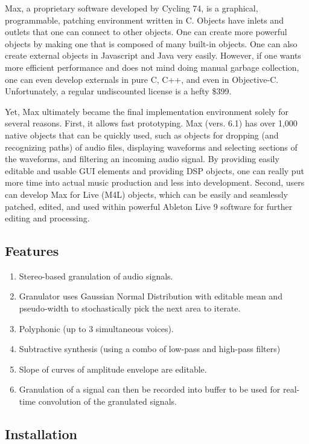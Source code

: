 \documentclass{article}
\begin{document}
		Max, a proprietary software developed by Cycling 74, is a graphical, programmable, patching environment written in C.  Objects have inlets and outlets that one can connect to other objects. One can create more powerful objects by making one that is composed of many built-in objects. One can also create external objects in Javascript and Java very easily. However, if one wants more efficient performance and does not mind doing manual garbage collection, one can even develop externals in pure C, C++, and even in Objective-C. Unfortunately, a regular undiscounted license is a hefty \$399.

		Yet, Max ultimately became the final implementation environment solely for several reasons. First, it allows fast prototyping. Max (vers. 6.1) has over 1,000 native objects that can be quickly used, such as objects for dropping (and recognizing paths) of audio files, displaying waveforms and selecting sections of the waveforms, and filtering an incoming audio signal. By providing easily editable and usable GUI elements and providing DSP objects, one can really put more time into actual music production and less into development. Second, users can develop Max for Live (M4L) objects, which can be easily and seamlessly patched, edited, and used within powerful Ableton Live 9 software for further editing and processing.
		\subsection{Features}

			\begin{enumerate}
				\item Stereo-based granulation of audio signals.
				\item Granulator uses Gaussian Normal Distribution with editable mean and pseudo-width to stochastically pick the next area to iterate.
				\item Polyphonic (up to 3 simultaneous voices).
				\item Subtractive synthesis (using a combo of low-pass and high-pass filters)
				\item Slope of curves of amplitude envelope are editable.
				\item Granulation of a signal can then be recorded into buffer to be used for real-time convolution of the granulated signals.

			\end{enumerate}
		\subsection{Installation}
\end{document}
